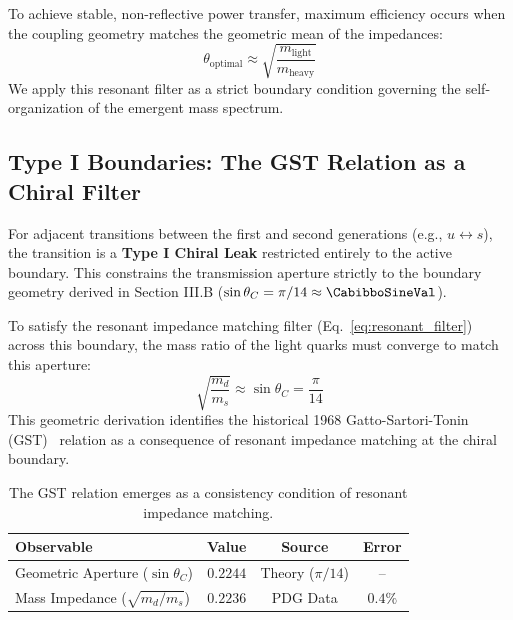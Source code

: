 To achieve stable, non-reflective power transfer, maximum efficiency occurs when the coupling geometry matches the geometric mean of the impedances:
\begin{equation}
    \theta_{\text{optimal}} \approx \sqrt{\frac{m_{\text{light}}}{m_{\text{heavy}}}}
    \label{eq:resonant_filter}
\end{equation}
We apply this resonant filter as a strict boundary condition governing the self-organization of the emergent mass spectrum.

\subsection{Type I Boundaries: The GST Relation as a Chiral Filter}

For adjacent transitions between the first and second generations (e.g., $u \leftrightarrow s$), the transition is a \textbf{Type I Chiral Leak} restricted entirely to the active boundary. This constrains the transmission aperture strictly to the boundary geometry derived in Section III.B ($\sin\theta_C = \pi/14 \approx \CabibboSineVal$). 

To satisfy the resonant impedance matching filter (Eq.~\ref{eq:resonant_filter}) across this boundary, the mass ratio of the light quarks must converge to match this aperture:
\begin{equation}
    \sqrt{\frac{m_d}{m_s}} \approx \sin\theta_C = \frac{\pi}{14}
\end{equation}
This geometric derivation identifies the historical 1968 Gatto-Sartori-Tonin (GST)~\cite{gatto_weak_1968} relation as a consequence of resonant impedance matching at the chiral boundary.

\begin{table}[h]
\centering
\caption{The GST relation emerges as a consistency condition of resonant impedance matching.}
\renewcommand{\arraystretch}{1.3}
\begin{tabular}{@{} l c c c @{}}
\toprule
\textbf{Observable} & \textbf{Value} & \textbf{Source} & \textbf{Error} \\
\midrule
Geometric Aperture ($\sin\theta_C$) & $\mathbf{0.2244}$ & Theory ($\pi/14$) & -- \\
Mass Impedance ($\sqrt{m_d/m_s}$) & $\mathbf{0.2236}$ & PDG Data & $\mathbf{0.4\%}$ \\
\bottomrule
\end{tabular}
\label{tab:gst_validation}
\end{table}

